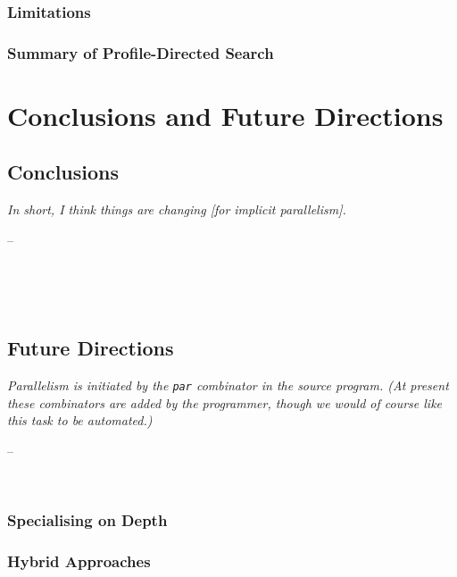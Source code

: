 \documentclass[openright, dottedtoc, headinclude, footinclude=true, a4paper, numbers=noenddot]{scrreprt}
\makeatletter
\newenvironment{chapquote}[2][2em]
  {\setlength{\@tempdima}{#1}%
   \def\chapquote@author{#2}%
   \parshape 1 \@tempdima \dimexpr\textwidth-2\@tempdima\relax%
   \itshape}
  {\par\normalfont\hfill--\ \chapquote@author\hspace*{\@tempdima}\par\noindent\hrulefill\\[1cm]}
\makeatother
\begin{document}
        \section{Limitations}
        \label{sec:limits}
        

        \section{Summary of Profile-Directed Search}
        \label{sec:informedConclusion}
        

\part{Conclusions and Future Directions}
\label{part:conclusion}

    \chapter{Conclusions}
    \label{chap:conclusions}
    \begin{chapquote}{\cite{spjQuote2005}}
     In short, I think things are changing \emph{[for implicit parallelism]}.
    \end{chapquote}
    
    \\[1cm]
    
    
    \chapter{Future Directions}
    \label{chap:future}
    \begin{chapquote}{\cite{trinder1996gum}}
    Parallelism is initiated by the \verb'par' combinator in the source
    program. (At present these combinators are added by the programmer, though
    we would of course like this task to be automated.)
    \end{chapquote}
    
    
        \section{Specialising on Depth}
        \label{sec:specialiseDepth}
        
    
        \section{Hybrid Approaches}
        \label{sec:hybrid}
        
    
\end{document}
